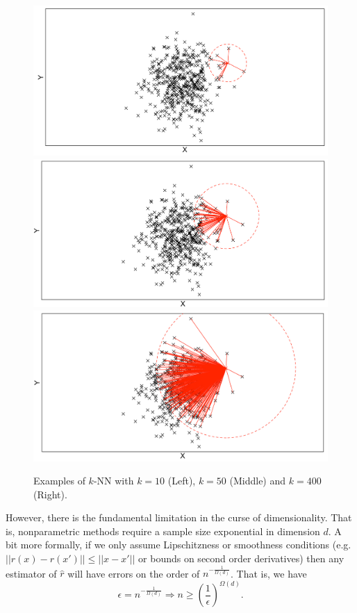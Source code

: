 \begin{figure}
	\centering
	\includegraphics[scale = .18]{figure/Lecture04/knn10.png}
	\includegraphics[scale = .18]{figure/Lecture04/knn50.png}
	\includegraphics[scale = .18]{figure/Lecture04/knn400.png}
	\caption{Examples of $k$-NN with $k=10$ (Left), $k=50$ (Middle) and $k=400$ (Right).} \label{fig:fig3}
\end{figure}

However, there is the fundamental limitation in the curse of dimensionality. That is, nonparametric methods require a sample size exponential in dimension $d$. A bit more formally, if we only assume Lipschitzness or smoothness conditions (e.g. $||r(x) - r(x')|| \leq ||x - x'||$ or bounds on second order derivatives) then any estimator of $\hat{r}$ will have errors on the order of $n^{-\frac{1}{\Omega(d)}}$. That is, we have
$$
\epsilon = n^{-\frac{1}{\Omega(d)}} \Rightarrow n \geq \left( \frac{1}{\epsilon} \right)^{\Omega(d)}.
$$

